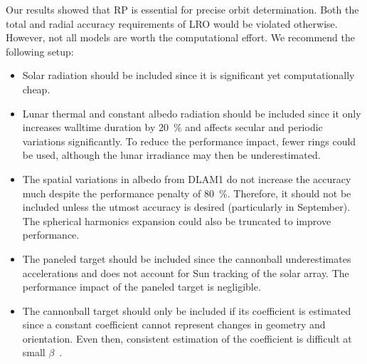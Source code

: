 Our results showed that \gls{RP} is essential for precise orbit determination. Both the total and radial accuracy requirements of \gls{LRO} would be violated otherwise. However, not all models are worth the computational effort. We recommend the following setup:
\begin{itemize}
    \item Solar radiation should be included since it is significant yet computationally cheap.
    \item Lunar thermal and constant albedo radiation should be included since it only increases walltime duration by \qty{20}{\percent} and affects secular and periodic variations significantly. To reduce the performance impact, fewer rings could be used, although the lunar irradiance may then be underestimated.
    \item The spatial variations in albedo from \gls{DLAM1} do not increase the accuracy much despite the performance penalty of \qty{80}{\percent}. Therefore, it should not be included unless the utmost accuracy is desired (particularly in September). The spherical harmonics expansion could also be truncated to improve performance.
    \item The paneled target should be included since the cannonball underestimates accelerations and does not account for Sun tracking of the solar array. The performance impact of the paneled target is negligible.
    \item The cannonball target should only be included if its coefficient is estimated since a constant coefficient cannot represent changes in geometry and orientation. Even then, consistent estimation of the coefficient is difficult at small $\beta$~\cite{Slojkowski2014}.
\end{itemize}

